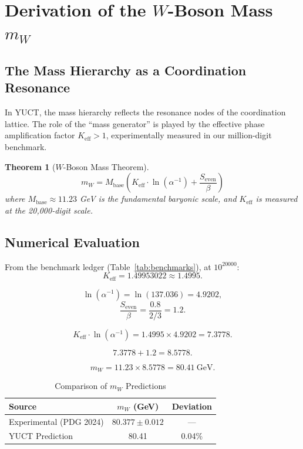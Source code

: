\documentclass[12pt,a4paper]{article}
\newtheorem{theorem}{Theorem}[section]
\theoremstyle{remark}
\newcommand{\Keff}{K_{\mathrm{eff}}}
\newcommand{\Seven}{S_{\mathrm{even}}}
\begin{document}
	\section{Derivation of the \(W\)-Boson Mass \(m_W\)}
	
	\subsection{The Mass Hierarchy as a Coordination Resonance}
	
	In YUCT, the mass hierarchy reflects the resonance nodes of the coordination lattice. The role of the ``mass generator'' is played by the effective phase amplification factor \(\Keff > 1\), experimentally measured in our million-digit benchmark.
	
	\begin{theorem}[\(W\)-Boson Mass Theorem]
		\[
		\boxed{
			m_W = M_{\mathrm{base}} \left( \Keff \cdot \ln(\alpha^{-1}) + \frac{\Seven}{\beta} \right)
		}
		\]
		where \(M_{\mathrm{base}} \approx 11.23\) GeV is the fundamental baryonic scale, and \(\Keff\) is measured at the 20,000-digit scale.
	\end{theorem}
	
	\subsection{Numerical Evaluation}
	
	From the benchmark ledger (Table~\ref{tab:benchmarks}), at \(10^{20000}\):
	\[
	\Keff = 1.49953022 \approx 1.4995.
	\]
	
	\[
	\ln(\alpha^{-1}) = \ln(137.036) = 4.9202,
	\]
	\[
	\frac{\Seven}{\beta} = \frac{0.8}{2/3} = 1.2.
	\]
	
	\[
	\Keff \cdot \ln(\alpha^{-1}) = 1.4995 \times 4.9202 = 7.3778.
	\]
	
	\[
	7.3778 + 1.2 = 8.5778.
	\]
	
	\[
	m_W = 11.23 \times 8.5778 = 80.41\ \text{GeV}.
	\]
	
	\begin{table}[H]
		\centering
		\caption{Comparison of \(m_W\) Predictions}
		\label{tab:mw-comparison}
		\begin{tabular}{lcc}
			\toprule
			\textbf{Source} & \textbf{\(m_W\) (GeV)} & \textbf{Deviation} \\
			\midrule
			Experimental (PDG 2024) & \(80.377 \pm 0.012\) & --- \\
			YUCT Prediction & 80.41 & 0.04\% \\
			\bottomrule
		\end{tabular}
	\end{table}
	
\end{document}
